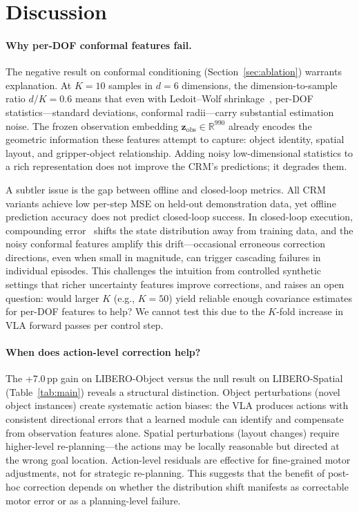 
\section{Discussion}
\label{sec:discussion}

\paragraph{Why per-DOF conformal features fail.}
The negative result on conformal conditioning (Section~\ref{sec:ablation}) warrants explanation.
At $K{=}10$ samples in $d{=}6$ dimensions, the dimension-to-sample ratio $d/K = 0.6$ means that even with Ledoit--Wolf shrinkage~\cite{ledoit2004well}, per-DOF statistics---standard deviations, conformal radii---carry substantial estimation noise.
The frozen observation embedding $\mathbf{z}_{\mathrm{obs}} \in \mathbb{R}^{990}$ already encodes the geometric information these features attempt to capture: object identity, spatial layout, and gripper-object relationship.
Adding noisy low-dimensional statistics to a rich representation does not improve the CRM's predictions; it degrades them.

A subtler issue is the gap between offline and closed-loop metrics.
All CRM variants achieve low per-step MSE on held-out demonstration data, yet offline prediction accuracy does not predict closed-loop success.
In closed-loop execution, compounding error~\cite{ross2011dagger} shifts the state distribution away from training data, and the noisy conformal features amplify this drift---occasional erroneous correction directions, even when small in magnitude, can trigger cascading failures in individual episodes.
This challenges the intuition from controlled synthetic settings that richer uncertainty features improve corrections, and raises an open question: would larger $K$ (e.g., $K{=}50$) yield reliable enough covariance estimates for per-DOF features to help?
We cannot test this due to the $K$-fold increase in VLA forward passes per control step.

\paragraph{When does action-level correction help?}
The +7.0\,pp gain on LIBERO-Object versus the null result on LIBERO-Spatial (Table~\ref{tab:main}) reveals a structural distinction.
Object perturbations (novel object instances) create systematic action biases: the VLA produces actions with consistent directional errors that a learned module can identify and compensate from observation features alone.
Spatial perturbations (layout changes) require higher-level re-planning---the actions may be locally reasonable but directed at the wrong goal location.
Action-level residuals are effective for fine-grained motor adjustments, not for strategic re-planning.
This suggests that the benefit of post-hoc correction depends on whether the distribution shift manifests as correctable motor error or as a planning-level failure.


